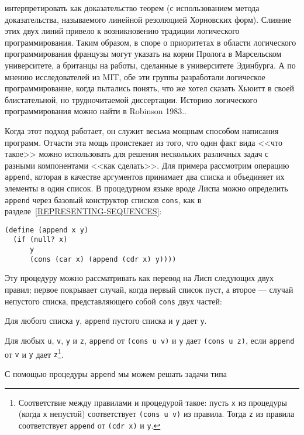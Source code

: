 {интерпретировать как доказательство теорем (с использованием метода
доказательства, называемого линейной резолюцией Хорновских
форм).
Слияние этих двух линий привело к возникновению традиции
логического программирования. Таким образом, в споре о приоритетах в
области логического программирования французы могут указать на
корни Пролога в
Марсельском университете, а британцы на работы,
сделанные в  университете Эдинбурга.  А по мнению исследователей из 
MIT, обе эти
группы разработали логическое программирование, когда пытались понять, что же
хотел сказать Хьюитт в своей блистательной, но трудночитаемой
диссертации. Историю логического программирования можно найти в
Robinson 1983.}.

Когда этот подход работает, он служит весьма мощным
способом написания программ.  Отчасти эта мощь проистекает из того,
что один факт вида <<что такое>> можно использовать для решения
нескольких различных задач с разными компонентами <<как сделать>>.  Для
примера рассмотрим операцию {\tt append}, которая в
качестве аргументов принимает два списка и объединяет их элементы в
один список.  В процедурном языке вроде Лиспа можно определить
{\tt append} через базовый конструктор списков
{\tt cons}, как в 
разделе~\ref{REPRESENTING-SEQUENCES}:

\begin{Verbatim}[fontsize=\small]
(define (append x y)
  (if (null? x)
      y
      (cons (car x) (append (cdr x) y))))
\end{Verbatim}
Эту процедуру можно рассматривать как перевод на Лисп следующих двух
правил; первое покрывает случай, когда первый список пуст, а второе
--- случай непустого списка, представляющего собой {\tt cons} двух частей:

\begin{plainlist}
\item
Для любого списка {\tt y}, {\tt append} пустого
списка и {\tt y} дает {\tt y}.

\item
Для любых {\tt u}, {\tt v},
{\tt y} и {\tt z}, {\tt append} от {\tt (cons u
v)} и {\tt y} дает {\tt (cons u z)}, если
{\tt append} от {\tt v} и {\tt y} дает
{\tt z}\footnote{Соответствие между правилами и процедурой такое:
пусть {\tt x} из процедуры (когда {\tt x} непустой)
соответствует {\tt (cons u v)} из правила.  Тогда
{\tt z} из правила соответствует {\tt append} от
{\tt (cdr x)} и {\tt y}.}.
\end{plainlist}
С помощью процедуры {\tt append} мы можем решать задачи
типа

